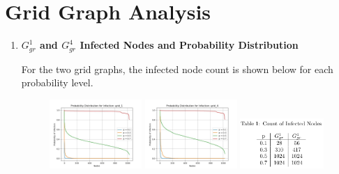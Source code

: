 \documentclass[letterpaper,9pt]{article}
\begin{document}
\section{Grid Graph Analysis}
\begin{enumerate}
    \item \textbf{$G^{1}_{gr}$ and $G^{4}_{gr}$ Infected Nodes and Probability Distribution}

    For the two grid graphs, the infected node count is shown below for each 
    probability level.


    \begin{figure}[htpb]
        \centering
        \includegraphics[width=0.33\textwidth]{pdist_grid_1.jpg}
        \includegraphics[width=0.33\textwidth]{pdist_grid_4.jpg}\hfill
        \includegraphics[width=0.3\textwidth]{tab1.png}
    \end{figure} 



\end{enumerate}
\end{document}
